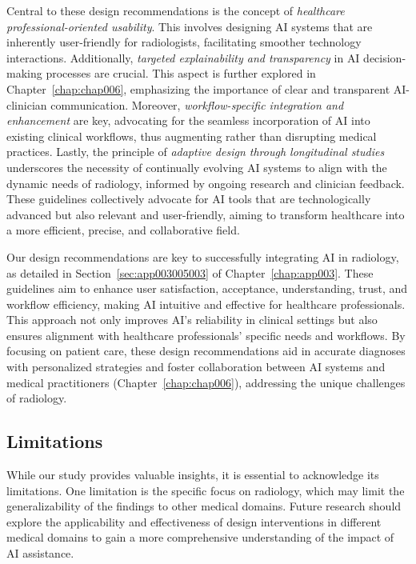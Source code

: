 
\textcolor{revised}{Central to these design recommendations is the concept of \textit{healthcare professional-oriented usability}.
This involves designing \ac{AI} systems that are inherently user-friendly for radiologists, facilitating smoother technology interactions.
Additionally, \textit{targeted explainability and transparency} in \ac{AI} decision-making processes are crucial.
This aspect is further explored in Chapter~\ref{chap:chap006}, emphasizing the importance of clear and transparent \ac{AI}-clinician communication.
Moreover, \textit{workflow-specific integration and enhancement} are key, advocating for the seamless incorporation of \ac{AI} into existing clinical workflows, thus augmenting rather than disrupting medical practices.
Lastly, the principle of \textit{adaptive design through longitudinal studies} underscores the necessity of continually evolving \ac{AI} systems to align with the dynamic needs of radiology, informed by ongoing research and clinician feedback.
These guidelines collectively advocate for \ac{AI} tools that are technologically advanced but also relevant and user-friendly, aiming to transform healthcare into a more efficient, precise, and collaborative field.}

\textcolor{revised}{Our design recommendations are key to successfully integrating \ac{AI} in radiology, as detailed in Section~\ref{sec:app003005003} of Chapter~\ref{chap:app003}.
These guidelines aim to enhance user satisfaction, acceptance, understanding, trust, and workflow efficiency, making \ac{AI} intuitive and effective for healthcare professionals.
This approach not only improves \ac{AI}'s reliability in clinical settings but also ensures alignment with healthcare professionals' specific needs and workflows.
By focusing on patient care, these design recommendations aid in accurate diagnoses with personalized strategies and foster collaboration between \ac{AI} systems and medical practitioners (Chapter~\ref{chap:chap006}), addressing the unique challenges of radiology.}

\subsection{Limitations}
\label{sec:chap005007004}

While our study provides valuable insights, it is essential to acknowledge its limitations.
One limitation is the specific focus on radiology, which may limit the generalizability of the findings to other medical domains.
Future research should explore the applicability and effectiveness of design interventions in different medical domains to gain a more comprehensive understanding of the impact of \ac{AI} assistance.

